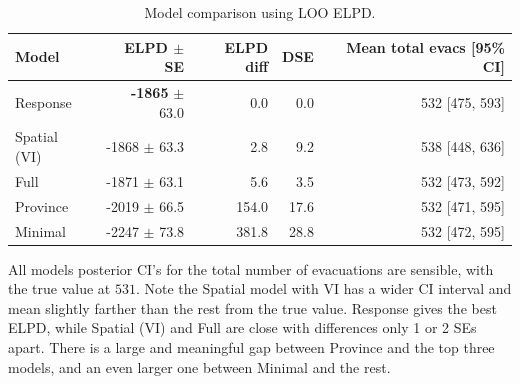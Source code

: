 \begin{table}[h!]
\centering
\caption{Model comparison using LOO ELPD.}
\label{tab:model_comparison_loo}
\begin{tabular}{lrrrr}
\hline
Model & ELPD $\pm$ SE & ELPD diff & DSE & Mean total evacs [95\% CI]  \\
\hline
Response & \textbf{-1865} $\pm$ 63.0 & 0.0 & 0.0 & 532 [475, 593] \\
Spatial (VI) & -1868 $\pm$ 63.3 & 2.8 & 9.2 & 538 [448, 636] \\
Full & -1871 $\pm$ 63.1 & 5.6 & 3.5 & 532 [473, 592] \\
Province & -2019 $\pm$ 66.5 & 154.0 & 17.6 & 532 [471, 595] \\
Minimal & -2247 $\pm$ 73.8 & 381.8 & 28.8 & 532 [472, 595] \\
\hline
\end{tabular}
\end{table}

All models posterior CI's for the total number of evacuations are sensible, with the true value at $531$. Note the Spatial model with VI has a wider CI interval and mean slightly farther than the rest from the true value. Response gives the best ELPD, while Spatial (VI) and Full are close with differences only 1 or 2 SEs apart. There is a large and meaningful gap between Province and the top three models, and an even larger one between Minimal and the rest.

